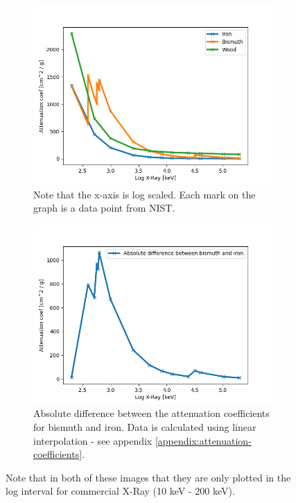 \documentclass{article}
\begin{document}
\begin{figure}[H]
    \centering
    \begin{subfigure}[b]{0.49\textwidth}
        \centering
        \includegraphics[scale=0.4]{images/attenuation_coef_zoom.png}
        \caption{\small Note that the x-axis is log scaled. Each mark on the graph is a data point from NIST. \newline}
        \label{fig:attenuation-coef-zoom}
    \end{subfigure}
    \begin{subfigure}[b]{0.49\textwidth}
        \centering
        \includegraphics[scale=0.4]{images/diff-attenuation-coef-bismuth-iron-zoom.png}
        \caption{\small Absolute difference between the attenuation coefficients for bismuth and iron. Data is calculated using linear interpolation - see appendix \ref{appendix:attenuation-coefficients}.}
        \label{fig:diff-attenuation-coef-bismuth-iron}
    \end{subfigure}
    \caption{\small Note that in both of these images that they are only plotted in the log interval for commercial X-Ray (10 keV - 200 keV).}
    \label{fig:both-attenuation-coeff-plots}
\end{figure}
\end{document}
